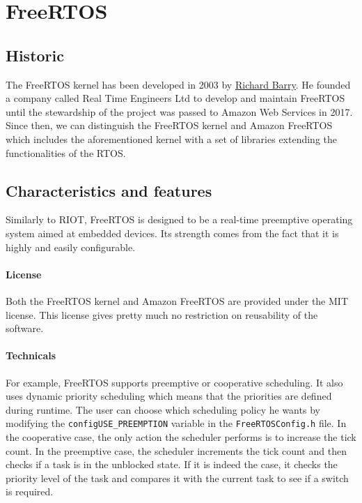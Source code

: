 \section{FreeRTOS}

\subsection{Historic}
The FreeRTOS kernel has been developed in 2003 by \href{https://www.linkedin.com/in/richard-barry-4562262/}{Richard Barry}. %
He founded a company called Real Time Engineers Ltd to develop and maintain FreeRTOS until the stewardship of the project was passed to Amazon Web Services in 2017.
Since then, we can distinguish the FreeRTOS kernel and Amazon FreeRTOS which includes the aforementioned kernel 
    with a set of libraries extending the functionalities of the RTOS.

\subsection{Characteristics and features}
Similarly to RIOT, FreeRTOS is designed to be a real-time preemptive operating system aimed at embedded devices.
Its strength comes from the fact that it is highly and easily configurable.\\

\paragraph{License} Both the FreeRTOS kernel and Amazon FreeRTOS are provided under the MIT license\cite{FreeRTOSlicense}.
This license gives pretty much no restriction on reusability of the software.

\paragraph{Technicals} For example, FreeRTOS supports preemptive or cooperative scheduling\cite{goyette}. 
It also uses dynamic priority scheduling which means that the priorities are defined during runtime.
The user can choose which scheduling policy he wants by modifying the \texttt{configUSE\_PREEMPTION} variable in the \texttt{FreeRTOSConfig.h} file.
In the cooperative case, the only action the scheduler performs is to increase the tick count.
In the preemptive case, the scheduler increments the tick count and then checks if a task is in the unblocked state.
If it is indeed the case, it checks the priority level of the task and compares it with the current task to see if a switch is required.\\

